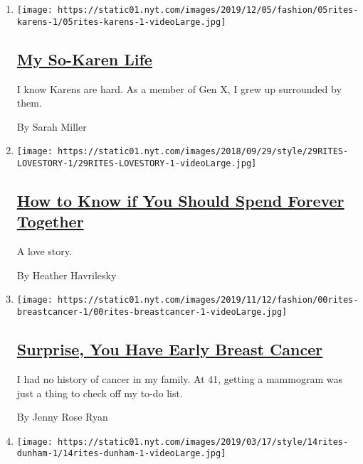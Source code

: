 \begin{enumerate}
\def\labelenumi{\arabic{enumi}.}
\item
  \texttt{[image: https://static01.nyt.com/images/2019/12/05/fashion/05rites-karens-1/05rites-karens-1-videoLarge.jpg]}

  \hypertarget{my-so-karen-life}{%
  \subsection{\texorpdfstring{\href{/2019/12/07/style/its-karentown.html}{My
  So-Karen Life}}{My So-Karen Life}}\label{my-so-karen-life}}

  I know Karens are hard. As a member of Gen X, I grew up surrounded by
  them.

  By Sarah Miller
\item
  \texttt{[image: https://static01.nyt.com/images/2018/09/29/style/29RITES-LOVESTORY-1/29RITES-LOVESTORY-1-videoLarge.jpg]}

  \hypertarget{how-to-know-if-you-should-spend-forever-together}{%
  \subsection{\texorpdfstring{\href{/2018/09/29/style/spending-forever-together.html}{How
  to Know if You Should Spend Forever
  Together}}{How to Know if You Should Spend Forever Together}}\label{how-to-know-if-you-should-spend-forever-together}}

  A love story.

  By Heather Havrilesky
\item
  \texttt{[image: https://static01.nyt.com/images/2019/11/12/fashion/00rites-breastcancer-1/00rites-breastcancer-1-videoLarge.jpg]}

  \hypertarget{surprise-you-have-early-breast-cancer}{%
  \subsection{\texorpdfstring{\href{/2019/10/24/style/breast-cancer-ductal-carcinoma-in-situ.html}{Surprise,
  You Have Early Breast
  Cancer}}{Surprise, You Have Early Breast Cancer}}\label{surprise-you-have-early-breast-cancer}}

  I had no history of cancer in my family. At 41, getting a mammogram
  was just a thing to check off my to-do list.

  By Jenny Rose Ryan
\item
  \texttt{[image: https://static01.nyt.com/images/2019/03/17/style/14rites-dunham-1/14rites-dunham-1-videoLarge.jpg]}


\end{enumerate}
